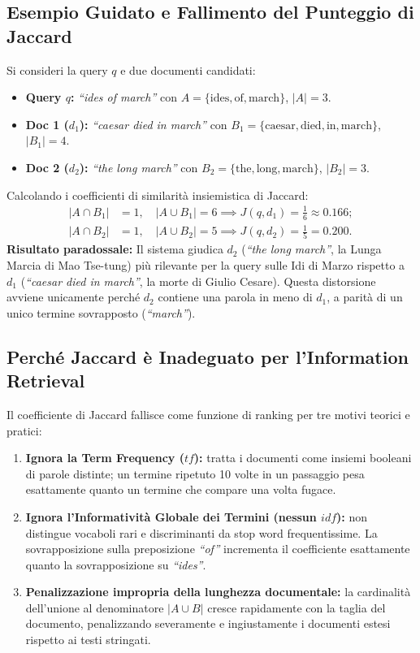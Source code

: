 \subsection{Esempio Guidato e Fallimento del Punteggio di Jaccard}

\begin{example}
Si consideri la query $q$ e due documenti candidati:
\begin{itemize}
    \item \textbf{Query $q$:} \textit{``ides of march''} con $A = \{\text{ides}, \text{of}, \text{march}\}$, $|A| = 3$.
    \item \textbf{Doc 1 ($d_1$):} \textit{``caesar died in march''} con $B_1 = \{\text{caesar}, \text{died}, \text{in}, \text{march}\}$, $|B_1| = 4$.
    \item \textbf{Doc 2 ($d_2$):} \textit{``the long march''} con $B_2 = \{\text{the}, \text{long}, \text{march}\}$, $|B_2| = 3$.
\end{itemize}

Calcolando i coefficienti di similarit\`a insiemistica di Jaccard:
\begin{align*}
|A \cap B_1| &= 1, \quad |A \cup B_1| = 6 \implies J(q, d_1) = \frac{1}{6} \approx 0.166; \\
|A \cap B_2| &= 1, \quad |A \cup B_2| = 5 \implies J(q, d_2) = \frac{1}{5} = 0.200.
\end{align*}
\textbf{Risultato paradossale:} Il sistema giudica $d_2$ (\textit{``the long march''}, la Lunga Marcia di Mao Tse-tung) pi\`u rilevante per la query sulle Idi di Marzo rispetto a $d_1$ (\textit{``caesar died in march''}, la morte di Giulio Cesare). Questa distorsione avviene unicamente perch\'e $d_2$ contiene una parola in meno di $d_1$, a parit\`a di un unico termine sovrapposto (\textit{``march''}).
\end{example}

\subsection{Perch\'e Jaccard \`e Inadeguato per l'Information Retrieval}
Il coefficiente di Jaccard fallisce come funzione di ranking per tre motivi teorici e pratici:
\begin{enumerate}
    \item \textbf{Ignora la Term Frequency ($tf$):} tratta i documenti come insiemi booleani di parole distinte; un termine ripetuto 10 volte in un passaggio pesa esattamente quanto un termine che compare una volta fugace.
    \item \textbf{Ignora l'Informativit\`a Globale dei Termini (nessun $idf$):} non distingue vocaboli rari e discriminanti da stop word frequentissime. La sovrapposizione sulla preposizione \textit{``of''} incrementa il coefficiente esattamente quanto la sovrapposizione su \textit{``ides''}.
    \item \textbf{Penalizzazione impropria della lunghezza documentale:} la cardinalit\`a dell'unione al denominatore $|A \cup B|$ cresce rapidamente con la taglia del documento, penalizzando severamente e ingiustamente i documenti estesi rispetto ai testi stringati.
\end{enumerate}

